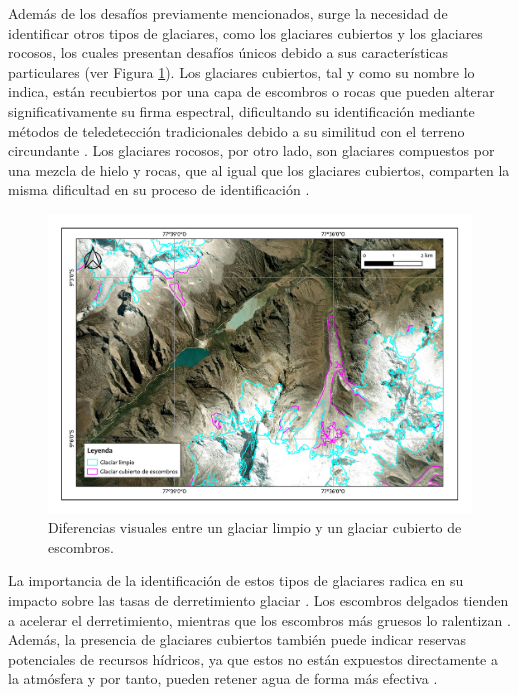 Además de los desafíos previamente mencionados, surge la necesidad de identificar otros tipos de glaciares, como los glaciares cubiertos y los glaciares rocosos, los cuales presentan desafíos únicos debido a sus características particulares (ver Figura \ref{fig:ComparacionGlaciares}). Los glaciares cubiertos, tal y como su nombre lo indica, están recubiertos por una capa de escombros o rocas que pueden alterar significativamente su firma espectral, dificultando su identificación mediante métodos de teledetección tradicionales debido a su similitud con el terreno circundante \cite{zhang2019glacier}. Los glaciares rocosos, por otro lado, son glaciares compuestos por una mezcla de hielo y rocas, que al igual que los glaciares cubiertos, comparten la misma dificultad en su proceso de identificación \cite{robson2020automated}.

\begin{figure}[H]
    \begin{center}
    \includegraphics[width=1\textwidth]{Images/ComparacionGlaciares.pdf}
    \end{center}
    \caption{Diferencias visuales entre un glaciar limpio y un glaciar cubierto de escombros.}
    \label{fig:ComparacionGlaciares}
\end{figure}

La importancia de la identificación de estos tipos de glaciares radica en su impacto sobre las tasas de derretimiento glaciar \cite{lu2021novel}. Los escombros delgados tienden a acelerar el derretimiento, mientras que los escombros más gruesos lo ralentizan \cite{anderson2021causes}. Además, la presencia de glaciares cubiertos también puede indicar reservas potenciales de recursos hídricos, ya que estos no están expuestos directamente a la atmósfera y por tanto, pueden retener agua de forma más efectiva \cite{zhang2019role, florath2021optical}.

